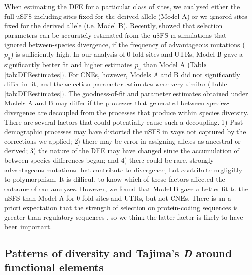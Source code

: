	When estimating the DFE for a particular class of sites, we analysed either the full uSFS including sites fixed for the derived allele (Model A) or we ignored sites fixed for the derived allele (i.e. Model B). Recently, \cite{RN354} showed that selection parameters can be accurately estimated from the uSFS in simulations that ignored between-species divergence, if the frequency of advantageous mutations ($p_a$) is sufficiently high. In our analysis of 0-fold sites and UTRs, Model B gave a significantly better fit and higher estimates $p_a$ than Model A (Table \ref{tab:DFEestimates}). For CNEs, however, Models A and B did not significantly differ in fit, and the selection parameter estimates were very similar (Table \ref{tab:DFEestimates}). The goodness-of-fit and parameter estimates obtained under Models A and B may differ if the processes that generated between species-divergence are decoupled from the processes that produce within species diversity. There are several factors that could potentially cause such a decoupling. 1) Past demographic processes may have distorted the uSFS in ways not captured by the corrections we applied; 2) there may be error in assigning alleles as ancestral or derived; 3) the nature of the DFE may have changed since the accumulation of between-species differences began; and 4) there could be rare, strongly advantageous mutations that contribute to divergence, but contribute negligibly to polymorphism. It is difficult to know which of these factors affected the outcome of our analyses. However, we found that Model B gave a better fit to the uSFS than Model A for 0-fold sites and UTRs, but not CNEs. There is an a priori expectation that the strength of selection on protein-coding sequences is greater than regulatory sequences \cite{RN122}, so we think the latter factor is likely to have been important. 

\subsection{Patterns of diversity and Tajima's \textit{D} around functional elements}

